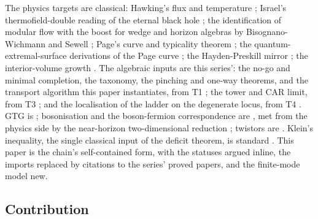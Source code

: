 \documentclass[11pt]{article}
\theoremstyle{definition}
\begin{document}
The physics targets are classical: Hawking's flux and temperature \cite{Hawking1975}; Israel's thermofield-double reading of the eternal black hole \cite{Israel1976}; the identification of modular flow with the boost for wedge and horizon algebras by Bisognano-Wichmann and Sewell \cite{BW1976, Sewell1982}; Page's curve and typicality theorem \cite{Page1993}; the quantum-extremal-surface derivations of the Page curve \cite{Penington2020, AEMM2019}; the Hayden-Preskill mirror \cite{HP2007}; the interior-volume growth \cite{CR2015}. The algebraic inputs are this series': the no-go and minimal completion, the taxonomy, the pinching and one-way theorems, and the transport algorithm this paper instantiates, from T1 \cite{ButlerT1}; the tower and CAR limit, from T3 \cite{ButlerT3}; and the localisation of the ladder on the degenerate locus, from T4 \cite{ButlerT4}. GTG is \cite{LDG1998, DoranLasenby2003}; bosonisation and the boson-fermion correspondence are \cite{PressleySegal1986}, met from the physics side by the near-horizon two-dimensional reduction \cite{RW2005}; twistors are \cite{Penrose1967}. Klein's inequality, the single classical input of the deficit theorem, is standard \cite{NielsenChuang}. This paper is the chain's self-contained form, with the statuses argued inline, the imports replaced by citations to the series' proved papers, and the finite-mode model new.

\subsection*{Contribution}
\end{document}

